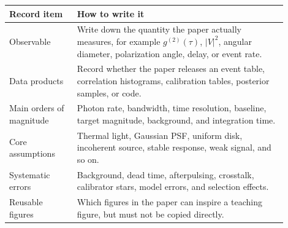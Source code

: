 \begin{longtable}{p{0.22\linewidth}p{0.68\linewidth}}
\toprule
Record item & How to write it \\
\midrule
Observable & Write down the quantity the paper actually measures, for example \(g^{(2)}(\tau)\), \(|V|^2\), angular diameter, polarization angle, delay, or event rate. \\
Data products & Record whether the paper releases an event table, correlation histograms, calibration tables, posterior samples, or code. \\
Main orders of magnitude & Photon rate, bandwidth, time resolution, baseline, target magnitude, background, and integration time. \\
Core assumptions & Thermal light, Gaussian PSF, uniform disk, incoherent source, stable response, weak signal, and so on. \\
Systematic errors & Background, dead time, afterpulsing, crosstalk, calibrator stars, model errors, and selection effects. \\
Reusable figures & Which figures in the paper can inspire a teaching figure, but must not be copied directly. \\
\bottomrule
\end{longtable}
